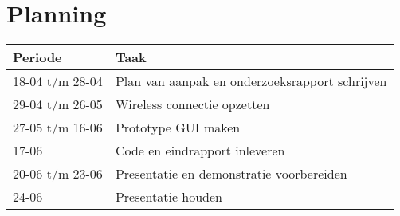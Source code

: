 \section{Planning}
{\renewcommand{\arraystretch}{1.5}
\begin{tabular}{ | l | l | }
	\hline
	\bfseries{Periode} & \bfseries{Taak} \\ \hline
	18-04 t/m 28-04 & Plan van aanpak en onderzoeksrapport schrijven\\ \hline
	29-04 t/m 26-05 & Wireless connectie opzetten   \\ \hline
	27-05 t/m 16-06 & Prototype GUI maken \\ \hline
	17-06 & Code en eindrapport inleveren \\ \hline
	20-06 t/m 23-06 & Presentatie en demonstratie voorbereiden \\ \hline
	24-06 & Presentatie houden \\ \hline
\end{tabular}
}

